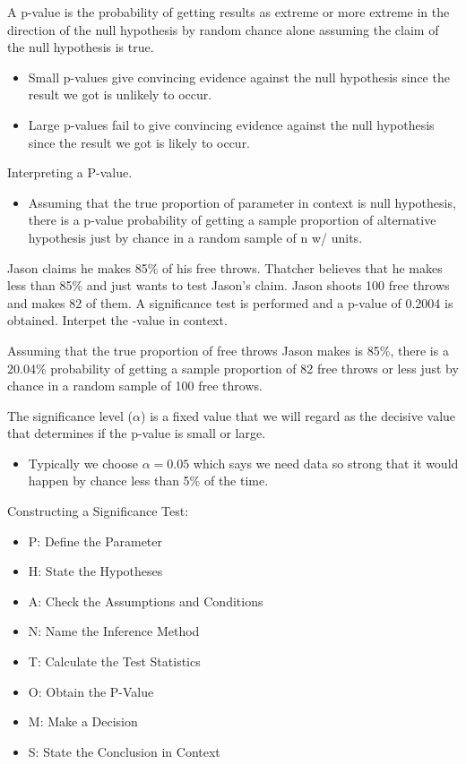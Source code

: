 \documentclass[../stats.tex]{subfiles}
\begin{document}
A p-value is the probability of getting results as extreme or more extreme in the direction of the null hypothesis by random chance alone assuming the claim of the null hypothesis is true.
\begin{itemize}
    \item Small p-values give convincing evidence against the null hypothesis since the result we got is unlikely to occur.
    \item Large p-values fail to give convincing evidence against the null hypothesis since the result we got is likely to occur.
\end{itemize}
Interpreting a P-value.
\begin{itemize}
    \item Assuming that the true proportion of {parameter in context} is {null hypothesis}, there is a {p-value} probability of getting a sample proportion of {alternative hypothesis} just by chance in a random sample of {n w/ units}.
\end{itemize}
\pagebreak
\begin{example}
    Jason claims he makes 85\% of his free throws. Thatcher believes that he makes less than 85\% and just wants to test Jason's claim. Jason shoots 100 free throws and makes 82 of them. A significance test is performed and a p-value of 0.2004 is obtained. Interpet the -value in context.

    Assuming that the true proportion of free throws Jason makes is 85\%, there is a 20.04\% probability of getting a sample proportion of 82 free throws or less just by chance in a random sample of 100 free throws.
\end{example}

The significance level ($\alpha$) is a fixed value that we will regard as the decisive value that determines if the p-value is small or large.
\begin{itemize}
    \item Typically we choose $\alpha=0.05$ which says we need data so strong that it would happen by chance less than 5\% of the time.
\end{itemize}

Constructing a Significance Test:
\begin{itemize}
    \item P: Define the Parameter 
    \item H: State the Hypotheses
    \item A: Check the Assumptions and Conditions 
    \item N: Name the Inference Method 
    \item T: Calculate the Test Statistics
    \item O: Obtain the P-Value 
    \item M: Make a Decision 
    \item S: State the Conclusion in Context 
\end{itemize}
\end{document}
